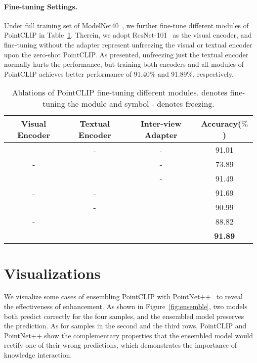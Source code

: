 \documentclass[10pt,twocolumn,letterpaper]{article}
\begin{document}
\paragraph{Fine-tuning Settings.}
Under full training set of ModelNet40~\cite{wu20153d}, we further fine-tune different modules of PointCLIP in Table~\ref{fine-tune}. Therein, we adopt ResNet-101~\cite{he2016deep} as the visual encoder, and fine-tuning without the adapter represent unfreezing the visual or textual encoder upon the zero-shot PointCLIP. As presented, unfreezing just the textual encoder normally hurts the performance, but training both encoders and all modules of PointCLIP achieves better performance of 91.40$\%$ and 91.89$\%$, respectively.
\begin{table}[ht]
\centering
\begin{adjustbox}{width=\linewidth}
	\begin{tabular}{cccc}
	\toprule
		 Visual Encoder & Textual Encoder 
		 & Inter-view Adapter  & Accuracy($\%$)\\ \midrule
		\Checkmark&- &- &91.01 \\
		- &\Checkmark &- &73.89 \\
		\Checkmark & \Checkmark & - & 91.49 \\
		- & - & \Checkmark & 91.69 \\
		\Checkmark & - & \Checkmark & 90.99 \\
		- & \Checkmark & \Checkmark & 88.82 \\
		\Checkmark & \Checkmark & \Checkmark & \textbf{91.89} \\
	\bottomrule
	\end{tabular}
\end{adjustbox}
\caption{Ablations of PointCLIP fine-tuning different modules. \Checkmark denotes fine-tuning the module and symbol - denotes freezing.}
\vspace{-0.5cm}
\label{fine-tune}
\end{table}
\section{Visualizations}
We visualize some cases of ensembling PointCLIP with PointNet++~\cite{qi2017pointnet++} to reveal the effectiveness of enhancement. As shown in Figure~\ref{fig:ensemble}, two models both predict correctly for the four samples, and the ensembled model preserves the prediction. As for samples in the second and the third rows, PointCLIP and PointNet++ show the complementary properties that the ensembled model would rectify one of their wrong predictions, which demonstrates the importance of knowledge interaction. 
\end{document}
